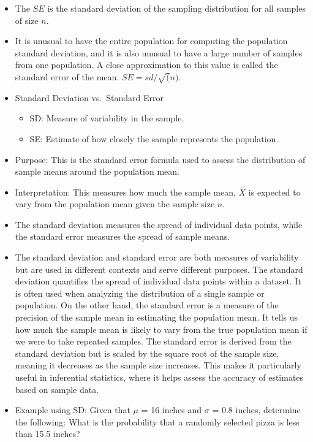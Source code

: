\documentclass[
  letterpaper,
  DIV=11,
  numbers=noendperiod]{scrreprt}
\providecommand{\tightlist}{%
  \setlength{\itemsep}{0pt}\setlength{\parskip}{0pt}}\usepackage{longtable,booktabs,array}
\begin{document}
\begin{itemize}
\item
  The \(SE\) is the standard deviation of the sampling distribution for
  all samples of size \(n\).
\item
  It is unusual to have the entire population for computing the
  population standard deviation, and it is also unusual to have a large
  number of samples from one population. A close approximation to this
  value is called the standard error of the mean. \(SE=sd/\sqrt(n)\).
\item
  Standard Deviation vs.~Standard Error

  \begin{itemize}
  \tightlist
  \item
    SD: Measure of variability in the sample.
  \item
    SE: Estimate of how closely the sample represents the population.
  \end{itemize}
\item
  Purpose: This is the standard error formula used to assess the
  distribution of sample means around the population mean.
\item
  Interpretation: This measures how much the sample mean, \(\bar{X}\) is
  expected to vary from the population mean given the sample size \(n\).
\item
  The standard deviation measures the spread of individual data points,
  while the standard error measures the spread of sample means.
\item
  The standard deviation and standard error are both measures of
  variability but are used in different contexts and serve different
  purposes. The standard deviation quantifies the spread of individual
  data points within a dataset. It is often used when analyzing the
  distribution of a single sample or population. On the other hand, the
  standard error is a measure of the precision of the sample mean in
  estimating the population mean. It tells us how much the sample mean
  is likely to vary from the true population mean if we were to take
  repeated samples. The standard error is derived from the standard
  deviation but is scaled by the square root of the sample size, meaning
  it decreases as the sample size increases. This makes it particularly
  useful in inferential statistics, where it helps assess the accuracy
  of estimates based on sample data.
\item
  Example using SD: Given that \(\mu\) = 16 inches and \(\sigma\) = 0.8
  inches, determine the following: What is the probability that a
  randomly selected pizza is less than 15.5 inches?
\end{itemize}
\end{document}
